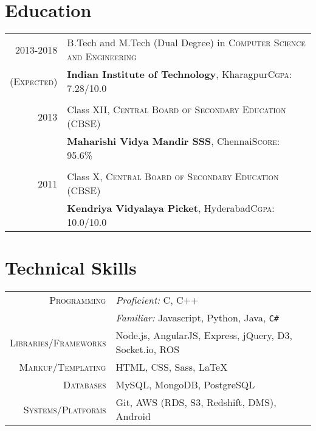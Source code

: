 \documentclass[a4paper,10pt]{extarticle} %
\begin{document}
\section{Education}

\begin{tabular}{r|p{16cm}}	
2013-2018 & B.Tech and M.Tech (Dual Degree) in \textsc{Computer Science and Engineering}\\
\textsc{(Expected)}&\textbf{Indian Institute of Technology}, Kharagpur\hfill\textsc{Cgpa}: 7.28/10.0\\
&\\


2013& Class XII, \textsc{}\textsc{Central Board of Secondary Education (CBSE)} \\
&\normalsize\textbf{Maharishi Vidya Mandir SSS}, Chennai\hfill\textsc{Score}: 95.6\%\\
&\\


2011 & Class X, \textsc{}\textsc{Central Board of Secondary Education (CBSE)} \\
&\normalsize\textbf{Kendriya Vidyalaya Picket}, Hyderabad\hfill\textsc{Cgpa}: 10.0/10.0\\

\end{tabular}


\section{Technical Skills}

\begin{tabular}{r|p{16cm}}
\textsc{Programming} & {\itshape{Proficient:}} C, C++\\
& {\itshape{Familiar:}} Javascript, Python, Java, \verb!C#! \\
\textsc{Libraries/Frameworks} & Node.js, AngularJS, Express, jQuery, D3, Socket.io, ROS\\
\textsc{Markup/Templating} & HTML, CSS, Sass, \LaTeX\\
\textsc{Databases} & MySQL, MongoDB, PostgreSQL\\
\textsc{Systems/Platforms} & Git, AWS (RDS, S3, Redshift, DMS), Android\\
\end{tabular}
\end{document}
